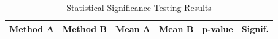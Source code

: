 \begin{table}[t]
\centering
\caption{Statistical Significance Testing Results}
\label{tab:statistics}
\begin{tabular}{llcccc}
\hline
\textbf{Method A} & \textbf{Method B} & \textbf{Mean A} & \textbf{Mean B} & \textbf{p-value} & \textbf{Signif.} \\
\hline
\hline
\end{tabular}
\end{table}